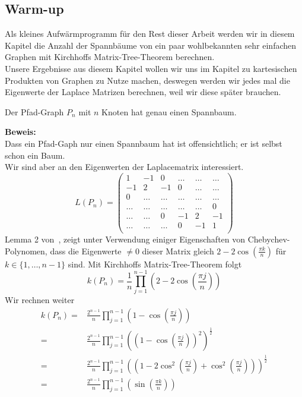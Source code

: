 \subsection{Warm-up}
Als kleines Aufwärmprogramm für den Rest dieser Arbeit werden wir in diesem Kapitel die Anzahl der Spannbäume von ein paar wohlbekannten sehr einfachen Graphen mit Kirchhoffs Matrix-Tree-Theorem berechnen.\\
Unsere Ergebnisse aus diesem Kapitel wollen wir uns im Kapitel zu kartesischen Produkten von Graphen zu Nutze machen, deswegen werden wir jedes mal die Eigenwerte der Laplace Matrizen berechnen, weil wir diese später brauchen.\\
\begin{Lms}
 Der Pfad-Graph $P_n$ mit $n$ Knoten hat genau einen Spannbaum.
\end{Lms}
\textbf{Beweis:}\\
Dass ein Pfad-Gaph nur einen Spannbaum hat ist offensichtlich; er ist selbst schon ein Baum.\\
Wir sind aber an den Eigenwerten der Laplacematrix interessiert.\\
\begin{equation}
L(P_n)=
\begin{pmatrix}
1&-1&0&\ldots&\ldots&\ldots\\
-1&2&-1&0&\ldots&\ldots\\
0&\ldots&\ldots&\ldots&\ldots&\ldots\\
\ldots&\ldots&\ldots&\ldots&\ldots&0\\
\ldots&\ldots&0&-1&2&-1\\
\ldots&\ldots&\ldots&0&-1&1\\
\end{pmatrix}
\end{equation}
Lemma 2 von~\cite{daoud_2014}, zeigt unter Verwendung einiger Eigenschaften von Chebychev-Polynomen, dass die Eigenwerte $\neq 0$ dieser Matrix gleich $2-2\cos \left(\frac{\pi k}{n}\right)$ für $k \in \{1,\ldots,n-1\}$ sind.
Mit Kirchhoffs Matrix-Tree-Theorem folgt
\begin{equation}
 \mathit{k}(P_n)=\frac{1}{n}\prod_{j=1}^{n-1} \left(2-2\cos \left(\frac{\pi j}{n}\right)\right)
\end{equation}
Wir rechnen weiter
\begin{equation}
\begin{split}
 \mathit{k}(P_n)={} & \frac{2^{n-1}}{n}\prod_{j=1}^{n-1} \left(1-\cos \left(\frac{\pi j}{n}\right)\right) \\
  ={}& \frac{2^{n-1}}{n}\prod_{j=1}^{n-1} \left(\left(1-\cos \left(\frac{\pi j}{n}\right)\right)^2\right)^{\frac{1}{2}} \\
  ={}&\frac{2^{n-1}}{n}\prod_{j=1}^{n-1} \left(\left(1-2\cos^2 \left(\frac{\pi j}{n}\right)+\cos^2 \left(\frac{\pi j}{n}\right)\right)\right)^{\frac{1}{2}} \\
  ={}& \frac{2^{n-1}}{n}\prod_{j=1}^{n-1} \left(\sin\left(\frac{\pi k}{n}\right) \right)
  \end{split}
\end{equation}
